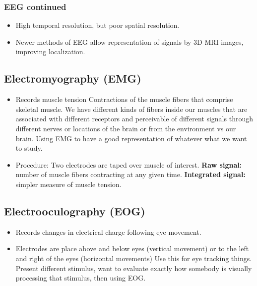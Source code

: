 \documentclass[12pt,a4paper]{article}
\begin{document}
	 \subsubsection{EEG continued}
	 
	 \begin{itemize}
	 	\item High temporal resolution, but poor spatial resolution. 
	 	\item Newer methods of EEG allow representation of signals by 3D MRI images, improving localization. 
	 \end{itemize}
	 
	 \subsection{Electromyography (EMG)}
	 
	 \begin{itemize}
	 	\item Records muscle tension
	 	\subitem Contractions of the muscle fibers that comprise skeletal muscle.
	 	\subsubitem We have different kinds of fibers inside our muscles that are associated with different receptors and perceivable of different signals through different nerves or locations of the brain or from the environment vs our brain.  
	 	\subsubitem Using EMG to have a good representation of whatever what we want to study.  
	 	\item Procedure:
	 	\subitem Two electrodes are taped over muscle of interest. 
	 	\subitem \textbf{Raw signal:} number of muscle fibers contracting at any given time. 
	 	\subitem \textbf{Integrated signal:} simpler measure of muscle tension. 
	 \end{itemize}
	 
	 \subsection{Electrooculography (EOG)}
	
	\begin{itemize}
		\item Records changes in electrical charge following eye movement. 
		\item Electrodes are place above and below eyes (vertical movement) or to the left and right of the eyes (horizontal movements)
		\subitem Use this for eye tracking things. 
		\subitem Present different stimulus, want to evaluate exactly how somebody is visually processing that stimulus, then using EOG. 
	\end{itemize}
	
\end{document}
